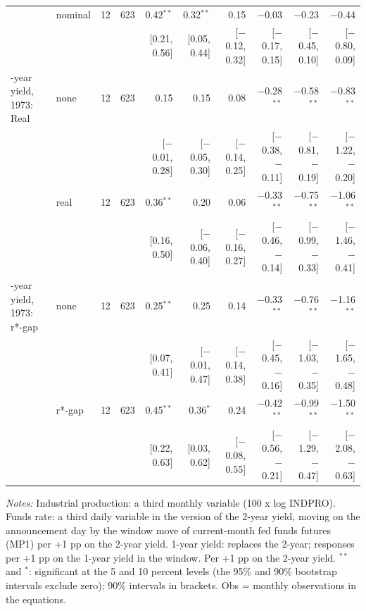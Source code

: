 \begin{table}[tp]
{\begin{tabular}{llcrrrrrrr}
 & nominal & 12 & 623 & 0.42$^{**}$ & 0.32$^{**}$ & 0.15 & $-$0.03 & $-$0.23 & $-$0.44\\
 & & & & {\scriptsize [0.21, 0.56]} & {\scriptsize [0.05, 0.44]} & {\scriptsize [$-$0.12, 0.32]} & {\scriptsize [$-$0.17, 0.15]} & {\scriptsize [$-$0.45, 0.10]} & {\scriptsize [$-$0.80, 0.09]}\\
\addlinespace
1-year yield, 1973: Real & none & 12 & 623 & 0.15 & 0.15 & 0.08 & $-$0.28$^{**}$ & $-$0.58$^{**}$ & $-$0.83$^{**}$\\
 & & & & {\scriptsize [$-$0.01, 0.28]} & {\scriptsize [$-$0.05, 0.30]} & {\scriptsize [$-$0.14, 0.25]} & {\scriptsize [$-$0.38, $-$0.11]} & {\scriptsize [$-$0.81, $-$0.19]} & {\scriptsize [$-$1.22, $-$0.20]}\\
 & real & 12 & 623 & 0.36$^{**}$ & 0.20 & 0.06 & $-$0.33$^{**}$ & $-$0.75$^{**}$ & $-$1.06$^{**}$\\
 & & & & {\scriptsize [0.16, 0.50]} & {\scriptsize [$-$0.06, 0.40]} & {\scriptsize [$-$0.16, 0.27]} & {\scriptsize [$-$0.46, $-$0.14]} & {\scriptsize [$-$0.99, $-$0.33]} & {\scriptsize [$-$1.46, $-$0.41]}\\
\addlinespace
1-year yield, 1973: r*-gap & none & 12 & 623 & 0.25$^{**}$ & 0.25 & 0.14 & $-$0.33$^{**}$ & $-$0.76$^{**}$ & $-$1.16$^{**}$\\
 & & & & {\scriptsize [0.07, 0.41]} & {\scriptsize [$-$0.01, 0.47]} & {\scriptsize [$-$0.14, 0.38]} & {\scriptsize [$-$0.45, $-$0.16]} & {\scriptsize [$-$1.03, $-$0.35]} & {\scriptsize [$-$1.65, $-$0.48]}\\
 & r*-gap & 12 & 623 & 0.45$^{**}$ & 0.36$^{*}$ & 0.24 & $-$0.42$^{**}$ & $-$0.99$^{**}$ & $-$1.50$^{**}$\\
 & & & & {\scriptsize [0.22, 0.63]} & {\scriptsize [0.03, 0.62]} & {\scriptsize [$-$0.08, 0.55]} & {\scriptsize [$-$0.56, $-$0.21]} & {\scriptsize [$-$1.29, $-$0.47]} & {\scriptsize [$-$2.08, $-$0.63]}\\
\bottomrule\end{tabular}}
\begin{flushleft}\footnotesize\textit{Notes:} Industrial production: a third monthly variable (100 x log INDPRO). Funds rate: a third daily variable in the version of the 2-year yield, moving on the announcement day by the window move of current-month fed funds futures (MP1) per +1 pp on the 2-year yield. 1-year yield: replaces the 2-year; responses per +1 pp on the 1-year yield in the window. Per +1 pp on the 2-year yield. $^{**}$ and $^{*}$: significant at the 5 and 10 percent levels (the 95\% and 90\% bootstrap intervals exclude zero); 90\% intervals in brackets. Obs = monthly observations in the equations.\end{flushleft}
\end{table}
